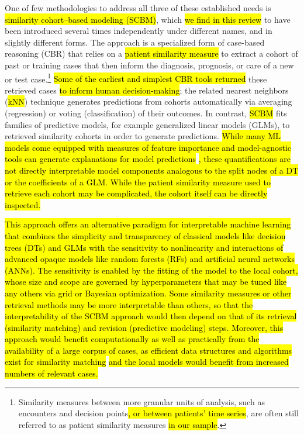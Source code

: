 \documentclass[sn-mathphys,Numbered,pdflatex]{sn-jnl}
\theoremstyle{remark}
\theoremstyle{definition}
\begin{document}
One of few methodologies to address all three of these established needs
is \hl{similarity cohort--based modeling (SCBM)}, which
\hl{we find in this review} to have been introduced several times
independently under different names, and in slightly different forms.
The approach is a specialized form of case-based reasoning (CBR) that
relies on a \hl{patient similarity measure }\citep{Brown2016} to extract
a cohort of past or training cases that then inform the diagnosis,
prognosis, or care of a new or test case.\footnote{Similarity measures
  between more granular units of analysis, such as encounters and
  decision points\hl{, or between patients' time series}, are often
  still referred to as patient similarity measures\hl{ in our sample}.}
\hl{Some of the earliest and simplest CBR tools returned} these
retrieved cases \hl{ to inform human decision-making}\citep{Aamodt1994};
the related nearest neighbors (\hl{kNN}) technique generates predictions
from cohorts automatically via averaging (regression) or voting
(classification) of their outcomes. In contrast, \hl{SCBM} fits families
of predictive models, for example generalized linear models (GLMs), to
retrieved similarity cohorts in order to generate predictions.
\hl{While many ML models come equipped with measures of feature importance and model-agnostic tools can generate explanations for model predictions }\citep{Molnar2023}\hl{, these quantifications are not directly interpretable model components analogous to the split nodes of a DT or the coefficients of a GLM.
While the patient similarity measure used to retrieve each cohort may be complicated, the cohort itself can be directly inspected.}

\hl{This approach offers an alternative paradigm for interpretable machine learning that combines the simplicity and transparency of classical models like decision trees (DTs) and GLMs with the sensitivity to nonlinearity and interactions of advanced opaque models like random forests (RFs) and artificial neural networks (ANNs). The sensitivity is enabled by the fitting of the model to the local cohort, whose size and scope are governed by hyperparameters that may be tuned like any others via grid or Bayesian optimization. Some similarity measures or other retrieval methods may be more interpretable than others, so that the interpretability of the SCBM approach would then depend on that of its retrieval (similarity matching) and revision (predictive modeling) steps. Moreover, this approach would benefit computationally as well as practically from the availability of a large corpus of cases, as efficient data structures and algorithms exist for similarity matching }\citep{Halder2024}\hl{ and the local models would benefit from increased numbers of relevant cases.}
\end{document}
